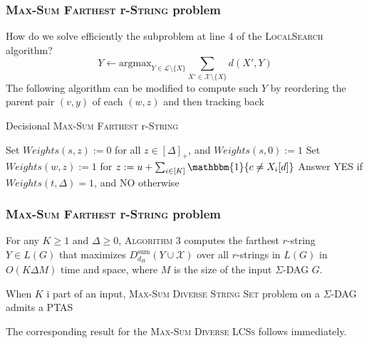 \documentclass{beamer}
\begin{document}
\begin{frame}
    \frametitle{\textsc{Max-Sum Farthest} r-\textsc{String} problem}
    How do we solve efficiently the subproblem at line 4 of the \textsc{LocalSearch} algorithm?
    \[
        Y \gets \text{argmax}_{Y \in \mathcal{L} \setminus \{X\}} \sum_{X' \in \mathcal{X} \setminus \{X\}} d(X', Y)
    \]
    The following algorithm can be modified to compute such $Y$ by reordering the parent pair $(v, y)$ of each $(w, z)$ and then tracking back
    \begin{algorithm}[H] \label{alg:ExactMaxSumFarthest}
        \small{\caption{Decisional \textsc{Max-Sum Farthest} r-\textsc{String}}}
        \footnotesize{\begin{algorithmic}[1]
                \State Set $Weights(s, z) := 0$ for all $z \in [\Delta]_+$, and $Weights(s, 0) := 1$\;
                \State Set $Weights(w, z) := 1$ for $z := u + \sum_{i \in [K]} \mathbbm{1}\{ c \not= X_i[d] \}$ 
                \EndFor
                \EndFor
                \State Answer YES if $Weights(t, \Delta) = 1$, and NO otherwise 
            \end{algorithmic}}
    \end{algorithm}
\end{frame}

\begin{frame}
    \frametitle{\textsc{Max-Sum Farthest} r-\textsc{String} problem}

    \begin{lemma}
        For any $K \geq 1$ and $\Delta \geq 0$, \textsc{Algorithm 3} computes the farthest $r$-string $Y \in L(G)$ that maximizes $D_{d_H}^{\text{sum}}(Y \cup \mathcal{X})$ over all $r$-strings in $L(G)$ in $O(K \Delta M)$ time and space, where $M$ is the size of the input $\Sigma$-DAG $G$.
    \end{lemma}

    \begin{theorem}
        When $K$ i part of an input, \textsc{Max-Sum Diverse String Set} problem on a $\Sigma$-DAG admits a PTAS
    \end{theorem}
    The corresponding result for the \textsc{Max-Sum Diverse LCSs} follows immediately.

\end{frame}
\end{document}
